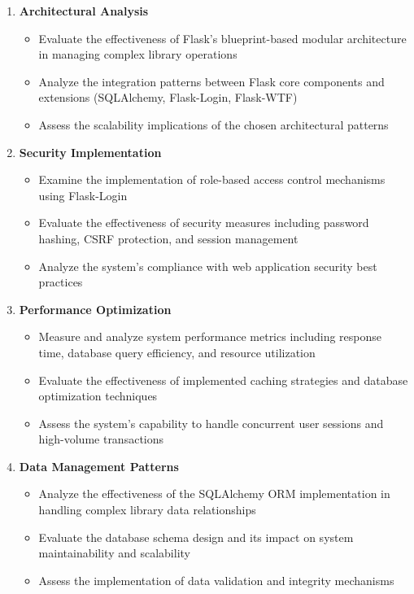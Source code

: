 \documentclass{article}
\begin{document}
\begin{enumerate}
    \item \textbf{Architectural Analysis}
    \begin{itemize}
        \item Evaluate the effectiveness of Flask's blueprint-based modular 
              architecture in managing complex library operations
        \item Analyze the integration patterns between Flask core components 
              and extensions (SQLAlchemy, Flask-Login, Flask-WTF)
        \item Assess the scalability implications of the chosen architectural 
              patterns
    \end{itemize}
    
    \item \textbf{Security Implementation}
    \begin{itemize}
        \item Examine the implementation of role-based access control mechanisms 
              using Flask-Login
        \item Evaluate the effectiveness of security measures including password 
              hashing, CSRF protection, and session management
        \item Analyze the system's compliance with web application security best 
              practices
    \end{itemize}
    
    \item \textbf{Performance Optimization}
    \begin{itemize}
        \item Measure and analyze system performance metrics including response 
              time, database query efficiency, and resource utilization
        \item Evaluate the effectiveness of implemented caching strategies and 
              database optimization techniques
        \item Assess the system's capability to handle concurrent user sessions 
              and high-volume transactions
    \end{itemize}
    
    \item \textbf{Data Management Patterns}
    \begin{itemize}
        \item Analyze the effectiveness of the SQLAlchemy ORM implementation in 
              handling complex library data relationships
        \item Evaluate the database schema design and its impact on system 
              maintainability and scalability
        \item Assess the implementation of data validation and integrity 
              mechanisms
    \end{itemize}
    

\end{enumerate}
\end{document}
